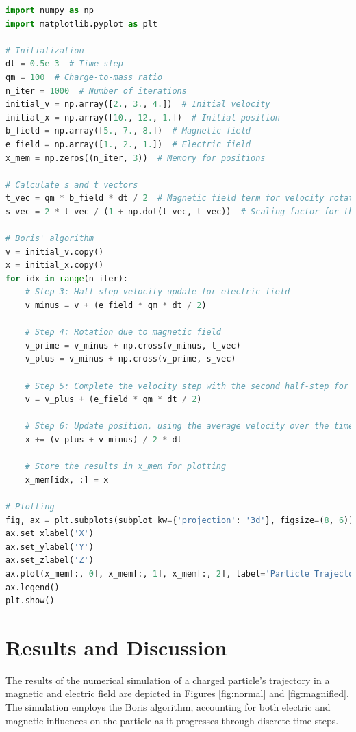 \documentclass{article}
\begin{document}
\begin{lstlisting}[language=python, title=Implementation of Boris Algorithm for Particle Motion]
import numpy as np
import matplotlib.pyplot as plt

# Initialization
dt = 0.5e-3  # Time step
qm = 100  # Charge-to-mass ratio
n_iter = 1000  # Number of iterations
initial_v = np.array([2., 3., 4.])  # Initial velocity
initial_x = np.array([10., 12., 1.])  # Initial position
b_field = np.array([5., 7., 8.])  # Magnetic field
e_field = np.array([1., 2., 1.])  # Electric field
x_mem = np.zeros((n_iter, 3))  # Memory for positions

# Calculate s and t vectors
t_vec = qm * b_field * dt / 2  # Magnetic field term for velocity rotation
s_vec = 2 * t_vec / (1 + np.dot(t_vec, t_vec))  # Scaling factor for the rotation

# Boris' algorithm
v = initial_v.copy()
x = initial_x.copy()
for idx in range(n_iter):
    # Step 3: Half-step velocity update for electric field
    v_minus = v + (e_field * qm * dt / 2)

    # Step 4: Rotation due to magnetic field
    v_prime = v_minus + np.cross(v_minus, t_vec)
    v_plus = v_minus + np.cross(v_prime, s_vec)

    # Step 5: Complete the velocity step with the second half-step for electric field
    v = v_plus + (e_field * qm * dt / 2)

    # Step 6: Update position, using the average velocity over the timestep
    x += (v_plus + v_minus) / 2 * dt

    # Store the results in x_mem for plotting
    x_mem[idx, :] = x

# Plotting
fig, ax = plt.subplots(subplot_kw={'projection': '3d'}, figsize=(8, 6))
ax.set_xlabel('X')
ax.set_ylabel('Y')
ax.set_zlabel('Z')
ax.plot(x_mem[:, 0], x_mem[:, 1], x_mem[:, 2], label='Particle Trajectory')
ax.legend()
plt.show()
\end{lstlisting}

\section{Results and Discussion}

The results of the numerical simulation of a charged particle's trajectory in a magnetic and electric field are depicted in Figures \ref{fig:normal} and \ref{fig:magnified}. The simulation employs the Boris algorithm, accounting for both electric and magnetic influences on the particle as it progresses through discrete time steps.
\end{document}
